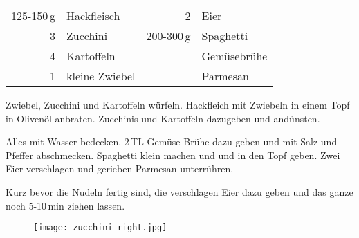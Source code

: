 \begin{table}[H]
  \centering
    
  \begin{tabular*}{1\textwidth}{rlrl}
125-150\,g & Hackfleisch & 2 & Eier \\
3 & Zucchini & 200-300\,g & Spaghetti \\
4 & Kartoffeln & & Gemüsebrühe \\
1 & kleine Zwiebel & & Parmesan \\
  \end{tabular*}
\end{table}

\begin{Notes}
\item Zwiebel, Zucchini und Kartoffeln würfeln. Hackfleich mit Zwiebeln in einem Topf in Olivenöl anbraten. Zucchinis und Kartoffeln dazugeben und andünsten.

\item Alles mit Wasser bedecken. 2\,TL Gemüse Brühe dazu geben und mit Salz und Pfeffer abschmecken. Spaghetti klein machen und und in den Topf geben. Zwei Eier verschlagen und gerieben Parmesan unterrühren.

\item Kurz bevor die Nudeln fertig sind, die verschlagen Eier dazu geben und das ganze noch 5-10\,min ziehen lassen. 
\end{Notes}
\vfill
\begin{figure}[H]
  \centering
  \texttt{[image: zucchini-right.jpg]}
\end{figure}
\newpage

